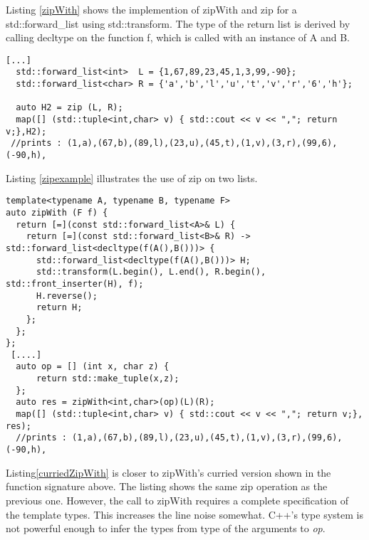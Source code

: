 \documentclass[12pt,fleqn]{article}
\begin{document}
Listing \ref{zipWith} shows the implemention of zipWith and zip for a std::forward\_list using std::transform.
The type of the return list is derived by calling decltype on the function f, which is called with an instance of A and B.

\begin{lstlisting}[caption=zipping two lists, label=zipexample ]
   [...]
  std::forward_list<int>  L = {1,67,89,23,45,1,3,99,-90};
  std::forward_list<char> R = {'a','b','l','u','t','v','r','6','h'};

  auto H2 = zip (L, R);
  map([] (std::tuple<int,char> v) { std::cout << v << ","; return v;},H2); 
 //prints : (1,a),(67,b),(89,l),(23,u),(45,t),(1,v),(3,r),(99,6),(-90,h),
\end{lstlisting}
Listing \ref{zipexample} illustrates the use of zip on two lists.

\begin{lstlisting}[caption=curried version of zipWith, label=curriedZipWith]
template<typename A, typename B, typename F>
auto zipWith (F f) {
  return [=](const std::forward_list<A>& L) {
    return [=](const std::forward_list<B>& R) -> std::forward_list<decltype(f(A(),B()))> {
      std::forward_list<decltype(f(A(),B()))> H;
      std::transform(L.begin(), L.end(), R.begin(), std::front_inserter(H), f);
      H.reverse();
      return H;
    };
  };
};
 [....]
  auto op = [] (int x, char z) {
      return std::make_tuple(x,z);
  };
  auto res = zipWith<int,char>(op)(L)(R);
  map([] (std::tuple<int,char> v) { std::cout << v << ","; return v;}, res);
  //prints : (1,a),(67,b),(89,l),(23,u),(45,t),(1,v),(3,r),(99,6),(-90,h),
\end{lstlisting}
Listing\ref{curriedZipWith} is closer to zipWith's curried version shown in the function signature above.
The listing shows the same zip operation as the previous one.
However, the call to zipWith requires a complete specification of the template types.
This increases the line noise somewhat.
C++'s type system is not powerful enough to infer the types from type of the arguments to {\em op}.


\end{document}

